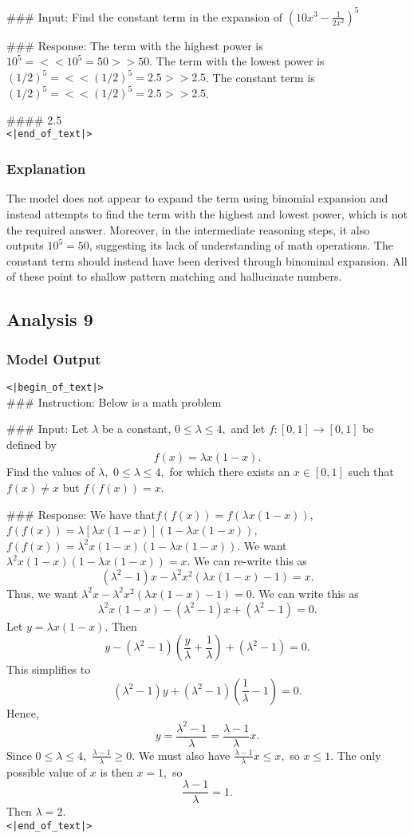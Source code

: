 \#\#\# Input: Find the constant term in the expansion of $\left(10x^3-\frac{1}{2x^2}\right)^{5}$ 

\#\#\# Response: The term with the highest power is $10^5=<<10^5=50>>50$.
The term with the lowest power is $(1/2)^5=<<(1/2)^5=2.5>>2.5$.
The constant term is $(1/2)^5=<<(1/2)^5=2.5>>2.5$.

\#\#\#\# 2.5
\\\texttt{<|end\_of\_text|>}

\subsubsection{Explanation}
The model does not appear to expand the term using binomial expansion and instead attempts to find the term with the highest and lowest power, which is not the required answer. Moreover, in the intermediate reasoning steps, it also outputs $10^5 = 50$, suggesting its lack of understanding of math operations. The constant term should instead have been derived through binominal expansion. All of these point to shallow pattern matching and hallucinate numbers. 

\subsection{Analysis 9}
\subsubsection{Model Output}
\texttt{<|begin\_of\_text|>} \\

\#\#\# Instruction: Below is a math problem

\#\#\# Input: Let $\lambda$ be a constant, $0 \le \lambda \le 4,$ and let $f : [0,1] \to [0,1]$ be defined by \[f(x) = \lambda x(1 - x).\]Find the values of $\lambda,$ $0 \le \lambda \le 4,$ for which there exists an $x \in [0,1]$ such that $f(x) \neq x$ but $f(f(x)) = x.$ 

\#\#\# Response: We have that$ f(f(x)) = f(\lambda x(1 - x))$, $f(f(x)) = \lambda [\lambda x(1 - x)](1 - \lambda x(1 - x))$, $f(f(x)) = \lambda^2 x(1 - x)(1 - \lambda x(1 - x)).$ We want $\lambda^2 x(1 - x)(1 - \lambda x(1 - x)) = x.$  We can re-write this as
\[(\lambda^2 - 1) x - \lambda^2 x^2 (\lambda x(1 - x) - 1) = x.\]Thus, we want $\lambda^2 x - \lambda^2 x^2 (\lambda x(1 - x) - 1) = 0.$  We can write this as \[\lambda^2 x(1 - x) - (\lambda^2 - 1) x + (\lambda^2 - 1) = 0.\]Let $y = \lambda x (1 - x).$  Then \[y - (\lambda^2 - 1) \left( \frac{y}{\lambda} + \frac{1}{\lambda} \right) + (\lambda^2 - 1) = 0.\]This simplifies to
\[(\lambda^2 - 1) y + (\lambda^2 - 1) \left( \frac{1}{\lambda} - 1 \right) = 0.\] Hence, \[y = \frac{\lambda^2 - 1}{\lambda} = \frac{\lambda - 1}{\lambda} x.\]Since $0 \le \lambda \le 4,$ $\frac{\lambda - 1}{\lambda} \ge 0.$  We must also have $\frac{\lambda - 1}{\lambda} x \le x,$ so $x \le 1.$  The only possible value of $x$ is then $x = 1,$ so \[\frac{\lambda - 1}{\lambda} = 1.\]Then $\lambda = \boxed{2}.$ 
\\\texttt{<|end\_of\_text|>}

